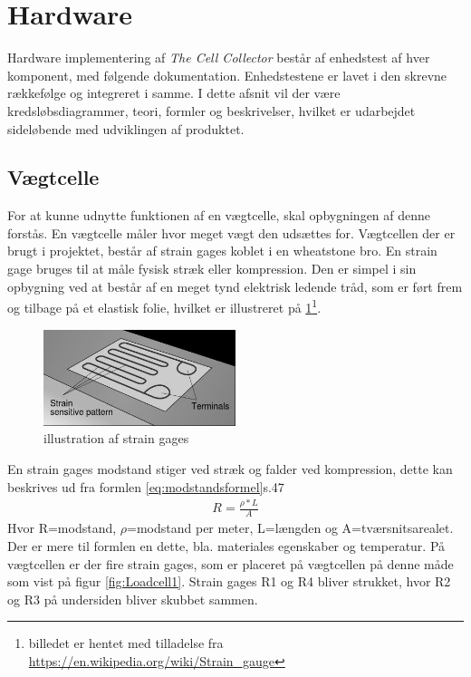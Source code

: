   \section{Hardware}
  Hardware implementering af \textit{The Cell Collector} består af enhedstest af hver komponent, med følgende dokumentation. Enhedstestene er lavet i den skrevne rækkefølge og integreret i samme. I dette afsnit vil der være kredsløbsdiagrammer, teori, formler og beskrivelser, hvilket er udarbejdet sideløbende med udviklingen af produktet. 
 	
 \subsection{Vægtcelle}
 For at kunne udnytte funktionen af en vægtcelle, skal opbygningen af denne forstås. En vægtcelle måler hvor meget vægt den udsættes for. Vægtcellen der er brugt i projektet, består af strain gages koblet i en wheatstone bro. En strain gage bruges til at måle fysisk stræk eller kompression. Den er simpel i sin opbygning ved at består af en meget tynd elektrisk ledende tråd, som er ført frem og tilbage på et elastisk folie, hvilket er illustreret på \ref{fig:Strain gages}\footnote{billedet er hentet med tilladelse fra  \url{https://en.wikipedia.org/wiki/Strain_gauge}}. 
 \begin{figure}[H]
	\centering
	\includegraphics[width=0.5\textwidth]{billeder/Hardware/straingages1.JPG}
	\caption{illustration af strain gages}
	\label{fig:Strain gages}
\end{figure}
En strain gages modstand stiger ved stræk og falder ved kompression, dette kan beskrives ud fra formlen \ref{eq:modstandsformel}\citep{Websterbog}{s.47}
 \begin{align}
 R=\frac{\rho*L}{A}
 \label{eq:modstandsformel}
 \end{align}
 Hvor R=modstand, $\rho$=modstand per meter, L=længden og A=tværsnitsarealet. Der er mere til formlen en dette, bla. materiales egenskaber og temperatur. På vægtcellen er der fire strain gages, som er placeret på vægtcellen på denne måde som vist på figur \ref{fig:Loadcell1}. Strain gages R1 og R4 bliver strukket, hvor R2 og R3 på undersiden bliver skubbet sammen.
 

